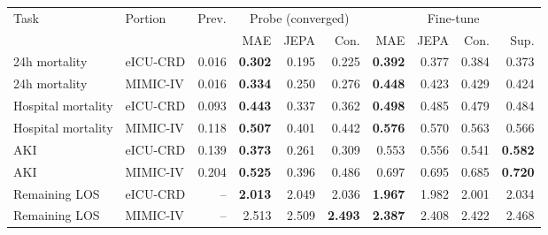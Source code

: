 \begin{tabular}{llrrrrrrrr}
\toprule
Task & Portion & Prev. & \multicolumn{3}{c}{Probe (converged)} & \multicolumn{4}{c}{Fine-tune} \\
\cmidrule(lr){4-6} \cmidrule(lr){7-10}
 & & & MAE & JEPA & Con. & MAE & JEPA & Con. & Sup. \\
\midrule
24h mortality & eICU-CRD & 0.016 & \textbf{0.302} & 0.195 & 0.225 & \textbf{0.392} & 0.377 & 0.384 & 0.373 \\
24h mortality & MIMIC-IV & 0.016 & \textbf{0.334} & 0.250 & 0.276 & \textbf{0.448} & 0.423 & 0.429 & 0.424 \\
Hospital mortality & eICU-CRD & 0.093 & \textbf{0.443} & 0.337 & 0.362 & \textbf{0.498} & 0.485 & 0.479 & 0.484 \\
Hospital mortality & MIMIC-IV & 0.118 & \textbf{0.507} & 0.401 & 0.442 & \textbf{0.576} & 0.570 & 0.563 & 0.566 \\
AKI & eICU-CRD & 0.139 & \textbf{0.373} & 0.261 & 0.309 & 0.553 & 0.556 & 0.541 & \textbf{0.582} \\
AKI & MIMIC-IV & 0.204 & \textbf{0.525} & 0.396 & 0.486 & 0.697 & 0.695 & 0.685 & \textbf{0.720} \\
\midrule
Remaining LOS & eICU-CRD & -- & \textbf{2.013} & 2.049 & 2.036 & \textbf{1.967} & 1.982 & 2.001 & 2.034 \\
Remaining LOS & MIMIC-IV & -- & 2.513 & 2.509 & \textbf{2.493} & \textbf{2.387} & 2.408 & 2.422 & 2.468 \\
\bottomrule
\end{tabular}

